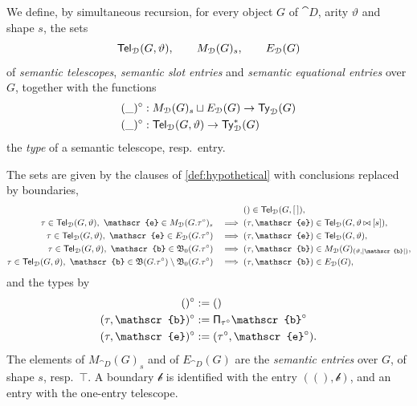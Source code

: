 \begin{definition}\label{def:semantic-telescopes}
    We define, by simultaneous recursion, for every object $G$ of $\cat{D}$, arity $\vartheta$ and shape $s$, the sets
    \[
        \mathsf{Tel}_{\mathcal{D}}(G, \vartheta), \qquad M_{\mathcal{D}}(G)_s, \qquad E_{\mathcal{D}}(G)
    \]
    of \emph{semantic telescopes}, \emph{semantic slot entries} and \emph{semantic equational entries} over $G$, together with the functions
    \begin{align*}        
        (\_)^{\circ} &: M_{\mathcal{D}}(G)_s \sqcup E_{\mathcal{D}}(G) \to \mathsf{Ty}_{\mathcal{D}}(G)\\
        (\_)^{\circ} &: \mathsf{Tel}_{\mathcal{D}}(G, \vartheta) \to \mathsf{Ty}^*_{\mathcal{D}}(G)
    \end{align*}
    the \emph{type} of a semantic telescope, resp.\ entry.

    The sets are given by the clauses of \cref{def:hypothetical} with conclusions replaced by boundaries,
    \begin{alignat*}{2}
        & && () \in \Tel_{\cat{D}}(G, \emptyar),\\
        \tau \in \Tel_{\cat{D}}(G, \vartheta),\ \mathscr{e} \in M_{\cat{D}}(G.\tau^{\circ})_s &&\implies{}& (\tau, \mathscr{e}) \in \Tel_{\cat{D}}(G, \vartheta \concat [s]),\\
        \tau \in \Tel_{\cat{D}}(G, \vartheta),\ \mathscr{e} \in E_{\cat{D}}(G.\tau^{\circ}) &&\implies{}& (\tau, \mathscr{e}) \in \Tel_{\cat{D}}(G, \vartheta),\\
        \tau \in \Tel_{\cat{D}}(G, \vartheta),\ \mathscr{b} \in \mathfrak{B}_0(G.\tau^{\circ}) &&\implies{}& (\tau, \mathscr{b}) \in M_{\cat{D}}(G)_{(\vartheta, |\mathscr{b}|)},\\
        \tau \in \Tel_{\cat{D}}(G, \vartheta),\ \mathscr{b} \in \mathfrak{B}(G.\tau^{\circ}) \setminus \mathfrak{B}_0(G.\tau^{\circ}) &&\implies{}& (\tau, \mathscr{b}) \in E_{\cat{D}}(G),
    \end{alignat*}
    and the types by
    \begin{align*}
        ()^{\circ} &:= ()\\
        (\tau,\mathscr{b})^{\circ} &:= \PiT_{\tau^{\circ}}\mathscr{b}^{\circ}\\
        (\tau,\mathscr{e})^{\circ} &:= (\tau^{\circ},\mathscr{e}^{\circ}).
    \end{align*}
    The elements of $M_{\cat{D}}(G)_s$ and of $E_{\cat{D}}(G)$ are the \emph{semantic entries} over $G$, of shape $s$, resp.\ $\top$. A boundary $\mathscr{b}$ is identified with the entry $((), \mathscr{b})$, and an entry with the one-entry telescope.
\end{definition}

